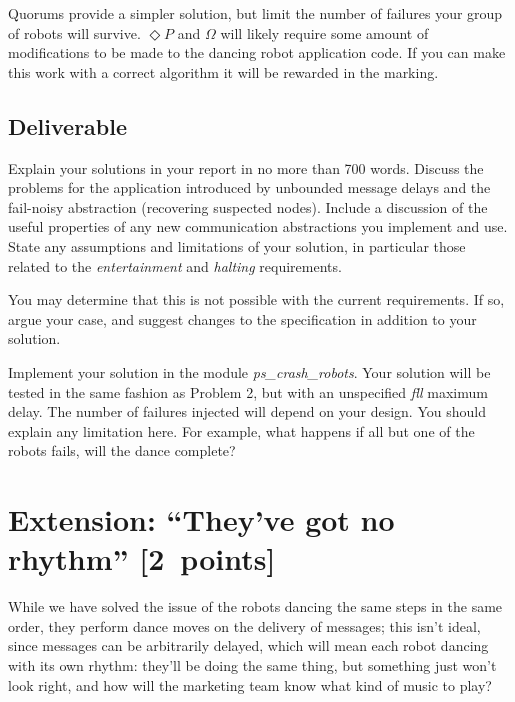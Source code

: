 \documentclass[a4paper]{article}
\begin{document}
Quorums provide a simpler solution, but limit the number of failures your
group of robots will survive. $\Diamond P$ and $\Omega$ will likely require
some amount of modifications to be made to the dancing robot application code.
If you can make this work with a correct algorithm it will be rewarded in the
marking.



\subsection*{Deliverable} %
\label{sub:p3_deliverable}

Explain your solutions in your report in no more than 700 words.
Discuss the problems for the application introduced by unbounded message
delays and the fail-noisy abstraction (recovering suspected nodes).
Include a discussion of the useful properties of any new
communication abstractions you implement and use.
State any assumptions and limitations of your solution, in particular those
related to the \emph{entertainment} and \emph{halting} requirements.

You may determine that this is not possible with the
current requirements. If so, argue your case, and suggest changes to the
specification in addition to your solution.

Implement your solution in the module \emph{ps\_crash\_robots}.
Your solution will be tested in the same fashion as Problem 2, but with
an unspecified \emph{fll} maximum delay. The number of failures injected will
depend on your design. You should explain any limitation here. For example,
what happens if all but one of the robots fails, will the dance complete?












\section*{Extension: ``They've got no rhythm'' [2~points]} %
\label{sec:buffered_dance_routine}

While we have solved the issue of the robots dancing the same steps in the
same order, they perform dance moves on the delivery of messages; this isn't
ideal, since messages can be arbitrarily delayed, which will mean each robot
dancing with its own rhythm: they'll be doing the same thing, but something
just won't look right, and how will the marketing team know what kind of music
to play?
\end{document}
